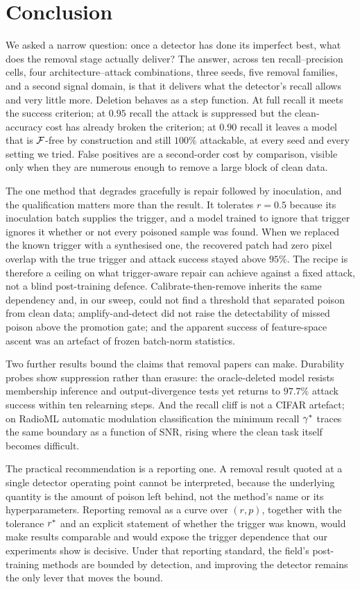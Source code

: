 \section{Conclusion}
\label{sec:conclusion}

We asked a narrow question: once a detector has done its imperfect best, what
does the removal stage actually deliver? The answer, across ten
recall--precision cells, four architecture--attack combinations, three seeds,
five removal families, and a second signal domain, is that it delivers what the
detector's recall allows and very little more. Deletion behaves as a step
function. At full recall it meets the success criterion; at $0.95$ recall the
attack is suppressed but the clean-accuracy cost has already broken the
criterion; at $0.90$ recall it leaves a model that is $\mathcal{F}$-free by
construction and still $100\%$ attackable, at every seed and every setting we
tried. False positives are a second-order cost by comparison, visible only when
they are numerous enough to remove a large block of clean data.

The one method that degrades gracefully is repair followed by inoculation, and
the qualification matters more than the result. It tolerates $r{=}0.5$ because
its inoculation batch supplies the trigger, and a model trained to ignore that
trigger ignores it whether or not every poisoned sample was found. When we
replaced the known trigger with a synthesised one, the recovered patch had zero
pixel overlap with the true trigger and attack success stayed above $95\%$. The
recipe is therefore a ceiling on what trigger-aware repair can achieve against a
fixed attack, not a blind post-training defence. Calibrate-then-remove inherits
the same dependency and, in our sweep, could not find a threshold that separated
poison from clean data; amplify-and-detect did not raise the detectability of
missed poison above the promotion gate; and the apparent success of feature-space
ascent was an artefact of frozen batch-norm statistics.

Two further results bound the claims that removal papers can make. Durability
probes show suppression rather than erasure: the oracle-deleted model resists
membership inference and output-divergence tests yet returns to $97.7\%$ attack
success within ten relearning steps. And the recall cliff is not a CIFAR
artefact; on RadioML automatic modulation classification the minimum recall
$\gamma^{\ast}$ traces the same boundary as a function of SNR, rising where the clean
task itself becomes difficult.

The practical recommendation is a reporting one. A removal result quoted at a
single detector operating point cannot be interpreted, because the underlying
quantity is the amount of poison left behind, not the method's name or its
hyperparameters. Reporting removal as a curve over $(r,p)$, together with the
tolerance $r^{\ast}$ and an explicit statement of whether the trigger was known,
would make results comparable and would expose the trigger dependence that our
experiments show is decisive. Under that reporting standard, the field's
post-training methods are bounded by detection, and improving the detector
remains the only lever that moves the bound.
